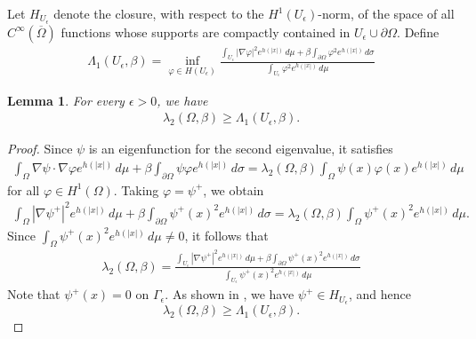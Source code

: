 \documentclass[11pt,leqno]{amsart}
\newtheorem{lemma}{Lemma}[section]
\def\l{\lambda}
\numberwithin{equation}{section}
\begin{document}
Let $H_{U_{\epsilon}}$ denote the closure,  with respect to the $H^{1}(U_{\epsilon})$-norm, of the space  of all $C^{\infty}(\overline{\Omega})$ functions whose supports are compactly contained in $U_{\epsilon}\cup \partial\Omega$. Define
\begin{align}
    \Lambda_{1}(U_{\epsilon},\beta)=\inf_{\varphi\in H(U_{\epsilon})}\frac{\int_{U_{\epsilon}}|\nabla \varphi|^{2}e^{h(|x|)}\,d\mu+\beta\int_{\partial \Omega}\varphi^{2}e^{h(|x|)}\,d\sigma}{\int_{U_{\epsilon}}\varphi^{2}e^{h(|x|)}\,d\mu}
\end{align}
\begin{lemma}
   For every $\epsilon>0$, we have 
   \begin{align}\label{6.2}
    \lambda_{2}(\Omega,\beta)\geq \Lambda_{1}(U_{\epsilon},\beta) . 
   \end{align}
\end{lemma}

\begin{proof} 
Since $\psi$ is an eigenfunction for  the second eigenvalue, it satisfies 
\begin{align*}
    \int_{\Omega}\nabla\psi \cdot \nabla \varphi e^{h(|x|)}\,d\mu+\beta\int_{\partial \Omega}\psi \varphi e^{h(|x|)}\,d\sigma=\lambda_{2}(\Omega,\beta)\int_{\Omega}\psi(x)\varphi(x)e^{h(|x|)}\,d\mu
\end{align*}
for all $\varphi\in H^{1}(\Omega)$.
Taking $\varphi=\psi^{+}$, we obtain
\begin{align*}
     \int_{\Omega}|\nabla \psi^{+}|^{2}e^{h(|x|)}\,d\mu+\beta\int_{\partial \Omega}\psi^{+}(x)^{2} e^{h(|x|)}\,d\sigma=\lambda_{2}(\Omega,\beta)\int_{\Omega}\psi^{+}(x)^{2}e^{h(|x|)}\,d\mu.
\end{align*}
Since $\int_{\Omega}\psi^{+}(x)^{2}e^{h(|x|)}\,d\mu\neq 0$, it follows that
\begin{align*}
    \l_{2}(\Omega,\beta)=\frac{\int_{U_{\epsilon}}|\nabla \psi^{+}|^{2}e^{h(|x|)}\,d\mu+\beta \int_{\partial \Omega}\psi^{+}(x)^{2}e^{h(|x|)}\,d\sigma}{\int_{U_{\epsilon}}\psi^{+}(x)^{2}e^{h(|x|)}\,d\mu}
\end{align*}
Note that $\psi^{+}(x)=0$ on $\Gamma_{\epsilon}$. As shown in \cite{KennegyPAMS}, we have $\psi^{+}\in H_{U_{\epsilon}}$, and hence
$$
\lambda_{2}(\Omega,\beta)\geq \Lambda_{1}(U_{\epsilon},\beta).
$$
\end{proof}
\end{document}
